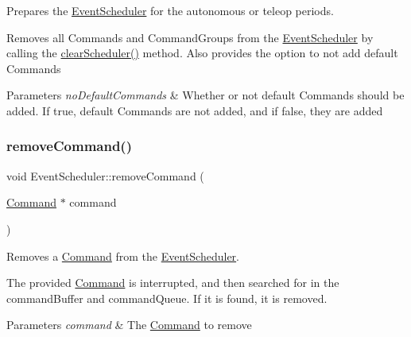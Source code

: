 Prepares the \mbox{\hyperlink{classlib_iterative_robot_1_1_event_scheduler}{Event\+Scheduler}} for the autonomous or teleop periods. 

Removes all Commands and Command\+Groups from the \mbox{\hyperlink{classlib_iterative_robot_1_1_event_scheduler}{Event\+Scheduler}} by calling the \mbox{\hyperlink{classlib_iterative_robot_1_1_event_scheduler_a92692ad8573d974bae62c62fccf808c4}{clear\+Scheduler()}} method. Also provides the option to not add default Commands


\begin{DoxyParams}{Parameters}
{\em no\+Default\+Commands} & Whether or not default Commands should be added. If true, default Commands are not added, and if false, they are added \\
\hline
\end{DoxyParams}
\mbox{\label{classlib_iterative_robot_1_1_event_scheduler_a038be4eb06e564fe47d326b458a8985c}} 
\subsubsection{\texorpdfstring{removeCommand()}{removeCommand()}}
{\footnotesize\ttfamily void Event\+Scheduler\+::remove\+Command (\begin{DoxyParamCaption}\item[{\mbox{\hyperlink{classlib_iterative_robot_1_1_command}{Command}} $\ast$}]{command }\end{DoxyParamCaption})}



Removes a \mbox{\hyperlink{classlib_iterative_robot_1_1_command}{Command}} from the \mbox{\hyperlink{classlib_iterative_robot_1_1_event_scheduler}{Event\+Scheduler}}. 

The provided \mbox{\hyperlink{classlib_iterative_robot_1_1_command}{Command}} is interrupted, and then searched for in the command\+Buffer and command\+Queue. If it is found, it is removed.


\begin{DoxyParams}{Parameters}
{\em command} & The \mbox{\hyperlink{classlib_iterative_robot_1_1_command}{Command}} to remove \\
\hline
\end{DoxyParams}
\mbox{\label{classlib_iterative_robot_1_1_event_scheduler_a6c1501cbee6a630b2b63881aa200fdf4}} 
